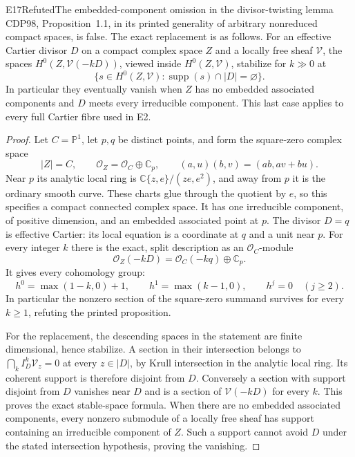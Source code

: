\begin{statement}{E17}{Refuted}{The embedded-component omission in the divisor-twisting lemma}
CDP98, Proposition~1.1, in its printed generality of arbitrary
nonreduced compact spaces, is false. The exact replacement is as
follows. For an effective Cartier divisor $D$ on a compact complex
space $Z$ and a locally free sheaf $\mathcal V$, the spaces
$H^0(Z,\mathcal V(-kD))$, viewed inside $H^0(Z,\mathcal V)$,
stabilize for $k\gg0$ at
\[
 \{s\in H^0(Z,\mathcal V):\operatorname{supp}(s)\cap|D|
       =\varnothing\}.
\]
In particular they eventually vanish when $Z$ has no embedded
associated components and $D$ meets every irreducible component.
This last case applies to every full Cartier fibre used in E2.
\end{statement}
\begin{proof}
Let $C=\mathbb P^1$, let $p,q$ be distinct points, and form the
square-zero complex space
\[
 |Z|=C,\qquad\mathcal O_Z=\mathcal O_C\oplus\mathbb C_p,
 \qquad(a,u)(b,v)=(ab,av+bu).
\]
Near $p$ its analytic local ring is
$\mathbb C\{z,e\}/(ze,e^2)$, and away from $p$ it is the
ordinary smooth curve. These charts glue through the quotient
by $e$, so this specifies a compact connected complex space.
It has one irreducible component, of positive dimension, and an
embedded associated point at $p$. The divisor $D=q$ is effective
Cartier: its local equation is a coordinate at $q$ and a unit
near $p$. For every integer $k$ there is the exact, split
description as an $\mathcal O_C$-module
\[
 \mathcal O_Z(-kD)=\mathcal O_C(-kq)\oplus\mathbb C_p.
\]
It gives every cohomology group:
\[
 h^0=\max(1-k,0)+1,\qquad h^1=\max(k-1,0),\qquad
 h^j=0\quad(j\geq2).
\]
In particular the nonzero section of the square-zero summand
survives for every $k\geq1$, refuting the printed proposition.

For the replacement, the descending spaces in the statement are
finite dimensional, hence stabilize. A section in their
intersection belongs to $\bigcap_k I_D^k\mathcal V_z=0$ at
every $z\in|D|$, by Krull intersection in the analytic local
ring. Its coherent support is therefore disjoint from $D$.
Conversely a section with support disjoint from $D$ vanishes
near $D$ and is a section of $\mathcal V(-kD)$ for every $k$.
This proves the exact stable-space formula. When there are no
embedded associated components, every nonzero submodule of a
locally free sheaf has support containing an irreducible
component of $Z$. Such a support cannot avoid $D$ under the
stated intersection hypothesis, proving the vanishing.
\end{proof}

